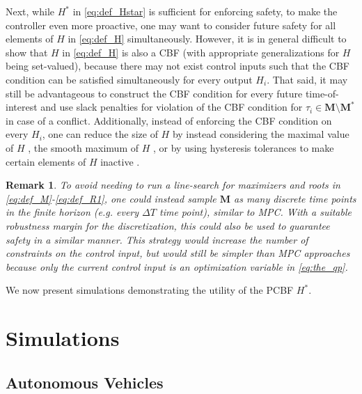 \documentclass[10pt,conference]{ieeeconf}
\renewcommand{\(}{\left(}
\renewcommand{\)}{\right)}
\renewcommand{\[}{\left[}
\renewcommand{\]}{\right]}
\newtheorem{remark}{Remark}
\newcommand{\extendedversion}[1]{{\color{black}#1}}
\begin{document}
Next, while $H^*$ in \eqref{eq:def_Hstar} is sufficient for enforcing safety, to make the controller even more proactive, one may want to consider future safety for all elements of $H$ in \eqref{eq:def_H} simultaneously. However, it is in general difficult to show that $H$ in \eqref{eq:def_H} is also a CBF (with appropriate generalizations for $H$ being set-valued), because there may not exist control inputs such that the CBF condition can be satisfied simultaneously for every output ${H}_i$. That said, it may still be advantageous to construct the CBF condition for every future time-of-interest and use slack penalties for violation of the CBF condition for $\tau_i\in\boldsymbol{M}\setminus\boldsymbol{M}^*$ in case of a conflict. \extendedversion{Additionally, instead of enforcing the CBF condition on every ${H}_i$, one can reduce the size of $H$ by instead considering the maximal value of $H$ \cite{Glotfelter2}, the smooth maximum of $H$ \cite{CBFs_STL}, or by using hysteresis tolerances to make certain elements of $H$ inactive \cite{Automatica}.}

\extendedversion{\begin{remark}
To avoid needing to run a line-search for maximizers and roots in \eqref{eq:def_M}-\eqref{eq:def_R1}, one could instead sample $\boldsymbol{M}$ as many discrete time points in the finite horizon (e.g. every $\Delta T$ time point), similar to MPC. With a suitable robustness margin for the discretization, this could also be used to guarantee safety in a similar manner. This strategy would increase the number of constraints on the control input, but would still be simpler than MPC approaches because only the current control input is {an optimization variable in \eqref{eq:the_qp}}.
\end{remark}}

We now present simulations demonstrating the utility of the PCBF $H^*$.

\section{Simulations} \label{sec:simulations}

\subsection{Autonomous Vehicles} \label{sec:vehicles}
\end{document}
